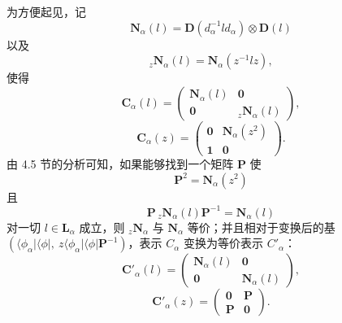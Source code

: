 为方便起见，记
\begin{equation*}
\mathbf{N}_{\alpha}(l) = \mathbf{D}(d^{-1}_{\alpha}ld_{\alpha}) \otimes \mathbf{D}(l)
\tag{4.8.14}
\end{equation*}
以及
\begin{equation*}
{}_{z}\mathbf{N}_{\alpha}(l) = \mathbf{N}_{\alpha}(z^{-1}lz),
\tag{4.8.15}
\end{equation*}
使得
\begin{equation*}
\mathbf{C}_{\alpha}(l) = \begin{pmatrix} \mathbf{N}_{\alpha}(l) & \mathbf{0}\\ \mathbf{0} & {}_{z}\mathbf{N}_{\alpha}(l) \end{pmatrix},
\tag{4.8.16}
\end{equation*}
\begin{equation*}
\mathbf{C}_{\alpha}(z) = \begin{pmatrix} \mathbf{0} & \mathbf{N}_{\alpha}(z^{2})\\ \mathbf{1} & \mathbf{0} \end{pmatrix}.
\tag{4.8.17}
\end{equation*}
由 4.5 节的分析可知，如果能够找到一个矩阵 $\mathbf{P}$ 使
\begin{equation*}
\mathbf{P}^{2} = \mathbf{N}_{\alpha}(z^{2})
\tag{4.8.18}
\end{equation*}
且
\begin{equation*}
\mathbf{P}\,{}_{z}\mathbf{N}_{\alpha}(l)\mathbf{P}^{-1} = \mathbf{N}_{\alpha}(l)
\tag{4.8.19}
\end{equation*}
对一切 $l \in \mathbf{L}_{\alpha}$ 成立，则 ${}_{z}\mathbf{N}_{\alpha}$ 与 $\mathbf{N}_{\alpha}$ 等价；并且相对于变换后的基 $(\langle \phi_{\alpha}|\langle \phi |,\ z\langle \phi_{\alpha}|\langle \phi |\mathbf{P}^{-1})$，表示 $C_{\alpha}$ 变换为等价表示 $C'_{\alpha}$：
\begin{equation*}
\mathbf{C}'_{\alpha}(l) = \begin{pmatrix} \mathbf{N}_{\alpha}(l) & \mathbf{0}\\ \mathbf{0} & \mathbf{N}_{\alpha}(l) \end{pmatrix},
\tag{4.8.20}
\end{equation*}
\begin{equation*}
\mathbf{C}'_{\alpha}(z) = \begin{pmatrix} \mathbf{0} & \mathbf{P}\\ \mathbf{P} & \mathbf{0} \end{pmatrix}.
\tag{4.8.21}
\end{equation*}
